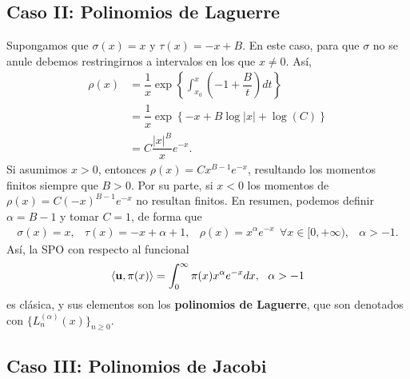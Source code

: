\subsection{Caso II: Polinomios de Laguerre}

Supongamos que $\sigma(x) = x$ y $\tau(x)=-x+B$. En este caso, para que $\sigma$ no se anule debemos restringirnos a intervalos en los que $x\neq0$. Así,
\begin{equation*}
    \begin{split}
        \rho(x) &= \dfrac 1 x \exp\left\{ \int_{x_0}^x \left(-1+\dfrac B t\right)dt \right\}\\
        &=  \dfrac 1 x \exp\left\{ -x + B\log|x| + \log(C) \right\} \\
        &= C \dfrac{|x|^B}{x}e^{-x}.
    \end{split}
\end{equation*}
Si asumimos $x>0$, entonces $\rho(x)=Cx^{B-1}e^{-x}$, resultando los momentos finitos siempre que $B > 0$. Por su parte, si $x<0$ los momentos de $\rho(x)=C(-x)^{B-1}e^{-x}$ no resultan finitos. En resumen, podemos definir $\alpha=B-1$ y tomar $C=1$, de forma que
\begin{equation}
    \label{eq:parametros-laguerre}
    \begin{array}{cccc}
        \sigma(x)=x, & \tau(x)=-x+\alpha+1, & \rho(x) = x^{\alpha} e^{-x}\ \ \forall x \in[0,+\infty), & \alpha > -1.
    \end{array}
\end{equation}
Así, la SPO con respecto al funcional
\begin{equation}
    \label{eq:func-laguerre}
    \prodesc{\uu}{\pi(x)} = \int_{0}^\infty \pi(x)x^{\alpha} e^{-x}dx, \ \ \alpha > -1
\end{equation}
es clásica, y sus elementos son los \textbf{polinomios de Laguerre}, que son denotados con $\{L_n^{(\alpha)}(x)\}_{n\geq 0}$.

\subsection{Caso III: Polinomios de Jacobi}

